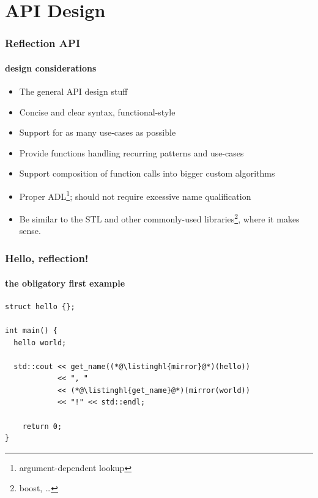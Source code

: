 \documentclass[compress,table,xcolor=table]{beamer}
\begin{document}
\section{API Design}
\begin{frame}
  \frametitle{Reflection API}
  \framesubtitle{design considerations}
  \larger
  \begin{itemize}
    \item The general API design stuff
    \item Concise and clear syntax, functional-style
    \item Support for as many use-cases as possible
    \item Provide functions handling recurring patterns and use-cases
    \item Support composition of function calls into bigger custom algorithms
    \item Proper ADL\footnote{argument-dependent lookup}; should not require
      excessive name qualification
    \item Be similar to the STL and other commonly-used libraries\footnote{
        boost, \ldots}, where it makes sense.
  \end{itemize}
\end{frame}
\begin{frame}[fragile]
  \frametitle{Hello, reflection!}
  \framesubtitle{the obligatory first example}
  \begin{lstlisting}[language=c++2x]
struct hello {};

int main() {
  hello world;

  std::cout << get_name((*@\listinghl{mirror}@*)(hello))
            << ", "
            << (*@\listinghl{get_name}@*)(mirror(world))
            << "!" << std::endl;

    return 0;
}
  \end{lstlisting}
\end{frame}
\end{document}
